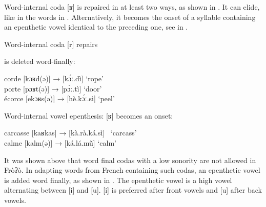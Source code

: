 \documentclass[output=paper]{langscibook}
\begin{document}
Word-internal coda [ʁ] is repaired in at least two ways, as shown in . It can elide, like in the words in . Alternatively, it becomes the onset of a syllable containing an epenthetic vowel identical to the preceding one, see in . 

    \begin{exe}
        \ex Word-internal coda {[r]} repairs \label{ex:traore:43}\\
        \begin{xlist}
            \ex {[ʁ]} is deleted word-finally:\label{ex:traore:43a}\\
            \begin{xlist}
                \ex corde         [kɔʁd(ə)]        →         [kɔ́ː.dì]          ‘rope’\\
                \ex  porte           [pɔʁt(ə)]          →         [pɔ́ː.tì]     ‘door’\\
                \ex écorce         [ekɔʁs(ə)]        →         [hè.kɔ́ː.sì]    ‘peel’\\
            \end{xlist}
            \ex Word-internal vowel epenthesis: {[ʁ]} becomes an onset:\label{ex:traore:43b}\\
            \begin{xlist}
                \ex carcasse     [kaʁkas]         →         [kà.rà.ká.sì]~    ‘carcass’\\
                \ex  calme           [kalm(ə)]        →         [ká.lá.mũ̀]       ‘calm’\\
            \end{xlist}
        \end{xlist}
    \end{exe}


It was shown above that word final codas with a low sonority are not allowed in Fròʔò. In adapting words from French containing such codas, an epenthetic vowel is added word finally, as shown in . The epenthetic vowel is a high vowel alternating between [i] and [u]. [i] is preferred after front vowels and [u] after back vowels.
\end{document}
